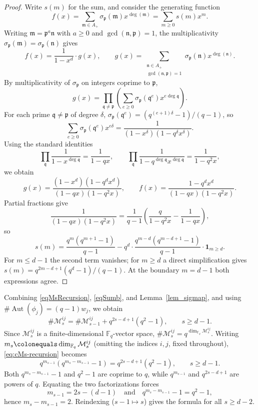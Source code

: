 \documentclass[12pt]{amsart}
\theoremstyle{definition}
\theoremstyle{remark}
\numberwithin{equation}{section}
\numberwithin{thm}{section}
\DeclareMathOperator{\Aut}{Aut}
\newcommand{\fm}{\mathfrak{m}}
\newcommand{\fn}{\mathfrak{n}}
\newcommand{\fp}{\mathfrak{p}}
\newcommand{\fq}{\mathfrak{q}}
\newcommand{\cM}{\mathcal{M}}
\newcommand{\F}{\mathbb{F}}
\begin{document}
	\begin{proof}
		Write $s(m)$ for the sum, and consider the generating function
		\[
		f(x) = \sum_{\fm\in A_+}\sigma_\fp(\fm) x^{\deg(\fm)} = \sum_{m\geq 0} s(m) x^m.
		\]
		Writing $\fm = \fp^a\fn$ with $a\geq 0$ and $\gcd(\fn,\fp) = 1$, the multiplicativity $\sigma_\fp(\fm) = \sigma_\fp(\fn)$ gives
		\[
		f(x) = \frac{1}{1-x^d}\cdot g(x), \qquad g(x) = \sum_{\substack{\fn\in A_+\\ \gcd(\fn,\fp)=1}} \sigma_\fp(\fn) x^{\deg(\fn)}.
		\]
		By multiplicativity of $\sigma_\fp$ on integers coprime to $\fp$,
		\[
		g(x) = \prod_{\fq\neq \fp}\left(\sum_{e\geq 0}\sigma_\fp(\fq^e) x^{e\deg\fq}\right).
		\]
		For each prime $\fq\neq \fp$ of degree $\delta$, $\sigma_\fp(\fq^e) = (q^{(e+1)\delta}-1)/(q-1)$, so
		\[
		\sum_{e\geq 0}\sigma_\fp(\fq^e) x^{e\delta} = \frac{1}{(1-x^\delta)(1-q^\delta x^\delta)}.
		\]
		Using the standard identities
		\[
		\prod_\fq \frac{1}{1-x^{\deg\fq}} = \frac{1}{1-qx}, \qquad \prod_\fq \frac{1}{1-q^{\deg\fq} x^{\deg\fq}} = \frac{1}{1-q^2 x},
		\]
		we obtain
		\[
		g(x) = \frac{(1-x^d)(1-q^d x^d)}{(1-qx)(1-q^2 x)}, \qquad f(x) = \frac{1-q^d x^d}{(1-qx)(1-q^2 x)}.
		\]
		Partial fractions give
		\[
		\frac{1}{(1-qx)(1-q^2 x)} = \frac{1}{q-1}\left(\frac{q}{1-q^2 x} - \frac{1}{1-qx}\right),
		\]
		so %
		\[
		s(m) %
		= \frac{q^m(q^{m+1}-1)}{q-1} - q^d \cdot \frac{q^{m-d}(q^{m-d+1}-1)}{q-1}\cdot \mathbf{1}_{m\geq d}.
		\]
		For $m\leq d-1$ the second term vanishes; for $m\geq d$ a direct simplification gives $s(m) = q^{2m-d+1}(q^d-1)/(q-1)$. At the boundary $m=d-1$ both expressions agree.
	\end{proof}
	
	Combining \eqref{eqMsRecursion}, \eqref{eqSumb}, and Lemma~\ref{lem_sigmap}, and using $\#\Aut(\phi_j) = (q-1)w_j$, we obtain
	\begin{equation}\label{eq:cMs-recursion}
		\#\cM_s^{ij} = \#\cM_{s-1}^{ij} + q^{2s-d+1}(q^2-1), \qquad s\geq d-1.
	\end{equation}
	Since $\cM_s^{ij}$ is a finite-dimensional $\F_q$-vector space, $\#\cM_s^{ij} = q^{\dim_{\F_q}\cM_s^{ij}}$. Writing $m_s \colonequals \dim_{\F_q}\cM_s^{ij}$ (omitting the indices $i,j$, fixed throughout), \eqref{eq:cMs-recursion} becomes
	\[
	q^{m_{s-1}}(q^{m_s - m_{s-1}} - 1) = q^{2s-d+1}(q^2-1), \qquad s\geq d-1.
	\]
	Both $q^{m_s-m_{s-1}}-1$ and $q^2-1$ are coprime to $q$, while $q^{m_{s-1}}$ and $q^{2s-d+1}$ are powers of $q$. Equating the two factorizations forces
	\[
	m_{s-1} = 2s - (d-1) \quad \text{and} \quad q^{m_s-m_{s-1}} - 1 = q^2 - 1,
	\]
	hence $m_s - m_{s-1} = 2$. Reindexing ($s-1 \mapsto s$) gives the formula for all $s\geq d-2$.
	
\end{document}
